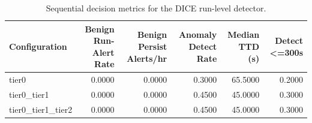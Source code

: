 \begin{table}[t]
\centering
\caption{Sequential decision metrics for the DICE run-level detector.}
\label{tab:dice_sequential_metrics}
\footnotesize
\begin{tabular}{lrrrrr}
\toprule
Configuration & Benign Run-Alert Rate & Benign Persist Alerts/hr & Anomaly Detect Rate & Median TTD (s) & Detect <=300s \\
\midrule
tier0 & 0.0000 & 0.0000 & 0.3000 & 65.5000 & 0.2000 \\
tier0_tier1 & 0.0000 & 0.0000 & 0.4500 & 45.0000 & 0.3000 \\
tier0_tier1_tier2 & 0.0000 & 0.0000 & 0.4500 & 45.0000 & 0.3000 \\
\bottomrule
\end{tabular}

\end{table}
